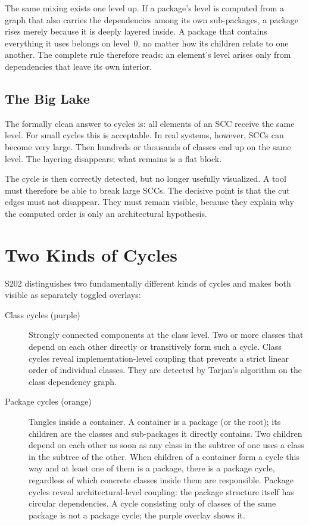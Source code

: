 \documentclass[a4paper,11pt]{article}
\begin{document}
The same mixing exists one level up. If a package's level is computed from a
graph that also carries the dependencies among its own sub-packages, a package
rises merely because it is deeply layered inside. A package that contains
everything it uses belongs on level~0, no matter how its children relate to one
another. The complete rule therefore reads: an element's level arises only from
dependencies that leave its own interior.

\subsection{The Big Lake}

The formally clean answer to cycles is: all elements of an SCC receive the
same level. For small cycles this is acceptable. In real systems, however,
SCCs can become very large. Then hundreds or thousands of classes end up on
the same level. The layering disappears; what remains is a flat block.

The cycle is then correctly detected, but no longer usefully visualized. A tool
must therefore be able to break large SCCs. The decisive point is that the cut
edges must not disappear. They must remain visible, because they explain why
the computed order is only an architectural hypothesis.

\section{Two Kinds of Cycles}

S202 distinguishes two fundamentally different kinds of cycles and makes both
visible as separately toggled overlays:

\begin{description}
  \item[Class cycles (purple)] Strongly connected components at the class level.
        Two or more classes that depend on each other directly or transitively
        form such a cycle. Class cycles reveal implementation-level coupling
        that prevents a strict linear order of individual classes. They are
        detected by Tarjan's algorithm on the class dependency graph.
  \item[Package cycles (orange)] Tangles inside a container. A container is a
        package (or the root); its children are the classes and sub-packages it
        directly contains. Two children depend on each other as soon as any
        class in the subtree of one uses a class in the subtree of the other.
        When children of a container form a cycle this way and at least one of
        them is a package, there is a package cycle, regardless of which
        concrete classes inside them are responsible. Package cycles reveal
        architectural-level coupling: the package structure itself has circular
        dependencies. A cycle consisting only of classes of the same package is
        not a package cycle; the purple overlay shows it.
\end{description}
\end{document}
